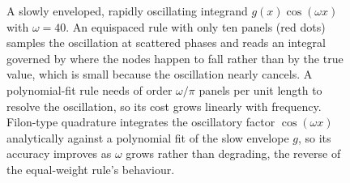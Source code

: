 \begin{figure}[htbp]
\centering
{}
\caption[Oscillatory integrand and the failure of equal-weight
quadrature]{A slowly enveloped, rapidly oscillating integrand
$g(x)\cos(\omega x)$ with $\omega = 40$. An equispaced rule with only
ten panels (red dots) samples the oscillation at scattered phases and
reads an integral governed by where the nodes happen to fall rather
than by the true value, which is small because the oscillation nearly
cancels. A polynomial-fit rule needs of order $\omega/\pi$ panels per
unit length to resolve the oscillation, so its cost grows linearly with
frequency. Filon-type quadrature integrates the oscillatory factor
$\cos(\omega x)$ analytically against a polynomial fit of the slow
envelope $g$, so its accuracy improves as $\omega$ grows rather than
degrading, the reverse of the equal-weight rule's behaviour.}
\label{fig:vol02:ch06:oscillatory-quadrature}
\end{figure}
